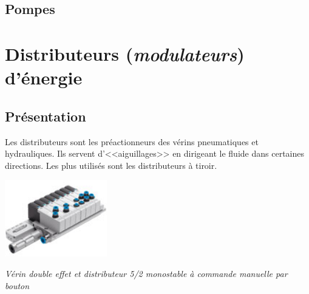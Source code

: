 \documentclass[10pt]{article}
\begin{document}
\subsection{Pompes}

\section{Distributeurs (\textit{modulateurs}) d'énergie}




\begin{minipage}[c]{.6\textwidth}
\subsection{Présentation}

Les distributeurs sont les préactionneurs des vérins pneumatiques et hydrauliques.
Ils servent d’<<aiguillages>> en dirigeant le fluide dans certaines directions.
Les plus utilisés sont les distributeurs à tiroir.

\end{minipage} \hfill
\begin{minipage}[c]{.37\textwidth}
\begin{center}
\includegraphics[width=.7\textwidth]{images/distributeur_festo}

\textit{Vérin double effet et distributeur 5/2 monostable à commande manuelle par bouton}
\end{center}
\end{minipage}
\end{document}
